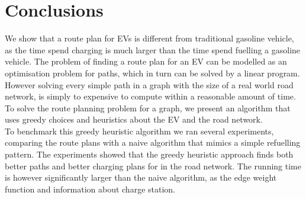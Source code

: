 \section{Conclusions}
We show that a route plan for EVs is different from traditional gasoline vehicle, as the time spend charging is much larger than the time spend fuelling a gasoline vehicle. The problem of finding a route plan for an EV can be modelled as an optimisation problem for paths, which in turn can be solved by a linear program. However solving every simple path in a graph with the size of a real world road network, is simply to expensive to compute within a reasonable amount of time. To solve the route planning problem for a graph, we present an algorithm that uses greedy choices and heuristics about the EV and the road network.\\
To benchmark this greedy heuristic algorithm we ran several experiments, comparing the route plans with a naive algorithm that mimics a simple refuelling pattern. The experiments showed that the greedy heuristic approach finds both better paths and better charging plans for in the road network. The running time is however significantly larger than the naive algorithm, as the edge weight function and information about charge station.